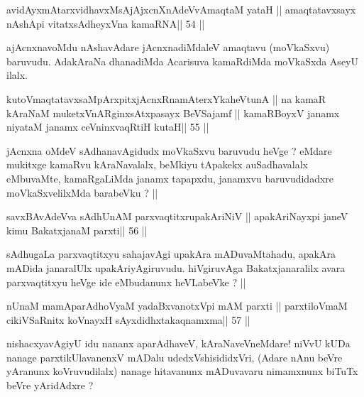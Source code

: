 
\begin{shl}
avidAyxmAtarxvidhavxMsAjAjxcnXnAdeVvAmaqtaM yataH ||
amaqtatavxsayx nA\s\s shA\s pi vitatxsAdheyxVna kamaRNA\hfill || 54 ||
\end{shl}

\begin{artha}
ajAcnxnavoMdu nAshavAdare jAcnxnadiMdaleV amaqtavu (moVkaSxvu)
baruvudu. AdakAraNa dhanadiMda Acarisuva kamaRdiMda moVkaSxda AseyU 
ilalx.
\end{artha}

\begin{shl}
kutoV\s maqtatavxsaMpArxpitxjAcnxRnamAterxYkaheVtunA ||
na kamaR kAraNaM muketxVnARginxsAtxpasayx BeVSajamf ||
kamaRBoyxV janamx niyataM janamx ceVninxvaqRtiH kutaH\hfill || 55 ||
\end{shl}

\begin{artha}
jAcnxna oMdeV sAdhanavAgidudx moVkaSxvu baruvudu heVge ? eMdare 
mukitxge kamaRvu kAraNavalalx, beMkiyu tApakekx auSadhavalalx
eMbuvaMte, kamaRgaLiMda janamx tapapxdu, janamxvu baruvudidadxre
moVkaSxvelilxMda barabeVku ? ||
\end{artha}

\begin{shl}
savxBAvAdeVva sAdhUnAM parxvaqtitxrupakAriNiV ||
apakAriNayxpi janeV kimu BakatxjanaM parxti\hfill || 56 ||
\end{shl}

\begin{artha}
sAdhugaLa parxvaqtitxyu sahajavAgi upakAra mADuvaMtahadu, apakAra
mADida janaralUlx upakAriyAgiruvudu. hiVgiruvAga Bakatxjanaralilx
avara parxvaqtitxyu heVge ide eMbudanunx heVLabeVke ? ||
\end{artha}

\begin{shl}
nUnaM mamAparAdhoV\s yaM yadaBxvanotxV\s pi mAM parxti ||
parxtiloVmaM cikiVSaRnitx koV\s nayxH sAyxdidhxtakaqnamxma\hfill || 57 ||
\end{shl}

\begin{artha}
nishacxyavAgiyU idu nananx aparAdhaveV, kAraNaveVneMdare! niVvU kUDa
nanage parxtikUlavanenxV mADalu udedxVshisididxVri, (Adare nAnu
beVre yAranunx koVruvudilalx) nanage  hitavanunx mADuvavaru nimamxnunx
biTuTx beVre yAridAdxre ?
\end{artha}

